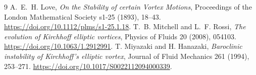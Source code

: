 \documentclass[10pt]{article}
\begin{document}
\begin{thebibliography}{9}\small
{} A.~E.~H. Love,
\emph{On the Stability of certain Vortex Motions},
Proceedings of the London Mathematical Society s1-25 (1893), 18--43.
\url{https://doi.org/10.1112/plms/s1-25.1.18}.
 T.~B. Mitchell and L.~F. Rossi,
\emph{The evolution of Kirchhoff elliptic vortices},
Physics of Fluids 20 (2008), 054103.
\url{https://doi.org/10.1063/1.2912991}.
 T. Miyazaki and H. Hanazaki,
\emph{Baroclinic instability of Kirchhoff's elliptic vortex},
Journal of Fluid Mechanics 261 (1994), 253--271.
\url{https://doi.org/10.1017/S0022112094000339}.
\end{thebibliography}
\end{document}
